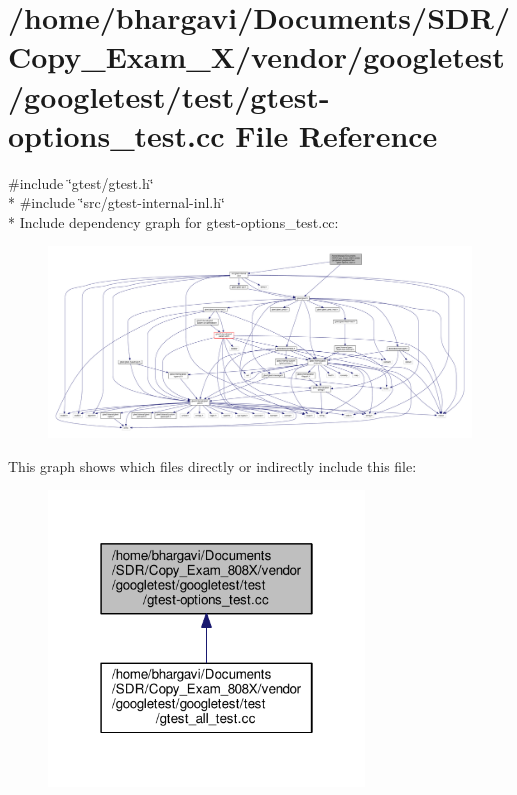 \hypertarget{gtest-options__test_8cc}{}\section{/home/bhargavi/\+Documents/\+S\+D\+R/\+Copy\+\_\+\+Exam\+\_\+X/vendor/googletest/googletest/test/gtest-\/options\+\_\+test.cc File Reference}
\label{gtest-options__test_8cc}
{\ttfamily \#include \char`\"{}gtest/gtest.\+h\char`\"{}}\\*
{\ttfamily \#include \char`\"{}src/gtest-\/internal-\/inl.\+h\char`\"{}}\\*
Include dependency graph for gtest-\/options\+\_\+test.cc\+:
\nopagebreak
\begin{figure}[H]
\begin{center}
\leavevmode
\includegraphics[width=350pt]{gtest-options__test_8cc__incl}
\end{center}
\end{figure}
This graph shows which files directly or indirectly include this file\+:
\nopagebreak
\begin{figure}[H]
\begin{center}
\leavevmode
\includegraphics[width=238pt]{gtest-options__test_8cc__dep__incl}
\end{center}
\end{figure}
